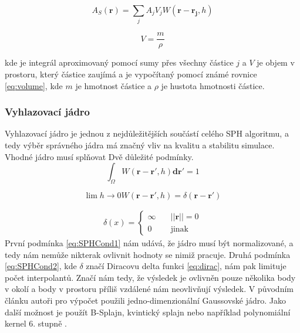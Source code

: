 \begin{equation}
    A_S(\mathbf{r}) = \sum_j A_j V_j W(\mathbf{r} - \mathbf{r_j},h)
    \label{eq:SPHsum}
\end{equation}

\begin{equation}
    V = \frac{m}{\rho}
    \label{eq:volume}
\end{equation}

 kde je integrál aproximovaný pomocí sumy přes všechny částice $j$ a $V$ je objem v prostoru, který částice zaujímá a je vypočítaný pomocí známé rovnice \ref{eq:volume}, kde $m$ je hmotnost částice a $\rho$ je hustota hmotnosti částice.  \cite{KelagerSPH}
 
 \subsubsection{Vyhlazovací jádro}
 Vyhlazovací jádro je jednou z nejdůležitějších součástí celého SPH algoritmu, a tedy výběr správného jádra má značný vliv na kvalitu a stabilitu simulace. Vhodné jádro musí splňovat Dvě důležité podmínky.
 \begin{equation}
     \int_\Omega W(\mathbf{r} - \mathbf{r}', h)\mathbf{dr}' = 1
     \label{eq:SPHCond1}
 \end{equation}
 
 \begin{equation}
     \lim{h \to 0} W(\mathbf{r} - \mathbf{r}',h) = \delta(\mathbf{r} - \mathbf{r}')
     \label{eq:SPHCond2}
 \end{equation}
 
 \begin{equation} \label{eq:dirac}
\begin{gathered}
\delta(x) =
  \begin{cases}
    \infty  & \quad ||\mathbf{r}|| = 0\\
    0       & \quad \text{jinak} 
  \end{cases}
\end{gathered}
\end{equation}
 První podmínka \ref{eq:SPHCond1} nám udává, že jádro musí být normalizované, a tedy nám nemůže nikterak ovlivnit hodnoty se nimiž pracuje. Druhá podmínka \ref{eq:SPHCond2}, kde $\delta$ značí Diracovu delta funkci \ref{eq:dirac}, nám pak limituje počet interpolantů. Značí nám tedy, že výsledek je ovlivněn pouze několika body v okolí a body v prostoru příliš vzdálené nám neovlivňují výsledek. V původním článku autoři pro výpočet použili jedno-dimenzionální Gaussovské jádro. Jako další možnost je použít B-Splajn, kvintický splajn \cite{Liu2010} nebo například polynomiální kernel 6. stupně \cite{Muller03}.
 
